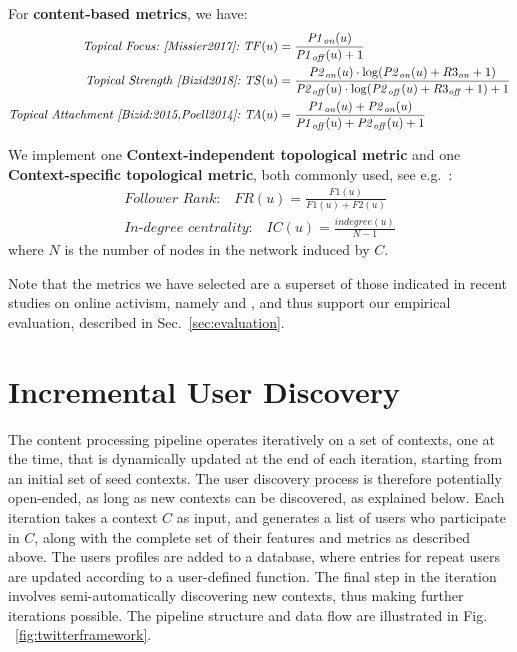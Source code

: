\documentclass[runningheads]{llncs}
\begin{document}
For \textbf{content-based metrics}, we have:
\begin{align}
\textit{Topical Focus:~\cite{Missier2017}:} ~ \mathit{TF}(u) & =  \frac{\mathit{P1}_{\mathit{on}}(u)}{\mathit{P1}_{\mathit{off}}(u) +1}    \label{eq:TF}\\
\textit{Topical Strength~\cite{Bizid2018}:} ~\mathit{TS}(u) & =	\frac{\mathit{P2}_{\mathit{on}}(u) \cdot \log(\mathit{P2}_{\mathit{on}}(u) + R3_{\mathit{on}} +1 )}{\mathit{P2}_{\mathit{off}}(u) \cdot \log(\mathit{P2}_{\mathit{off}}(u) + R3_{\mathit{off}} +1 ) + 1}   \label{eq:TS} \\
\textit{Topical Attachment~\cite{Bizid:2015,Poell2014}:} ~\mathit{TA}(u) & = \frac{\mathit{P1}_{\mathit{on}}(u) + \mathit{P2}_{\mathit{on}}(u)}{\mathit{P1}_{\mathit{off}}(u) + \mathit{P2}_{\mathit{off}}(u) +1} \label{eq:TA}
\end{align}

We implement one \textbf{Context-independent topological metric} and one \textbf{Context-specific topological metric}, both commonly used, see e.g.~\cite{RIQUELME2016949}:
\begin{align}
\textit{Follower Rank:}  \quad \mathit{FR}(u) = \frac{\mathit{F1}(u)}{\mathit{F1}(u)+\mathit{F2}(u)}   \label{eq:FR}\\
\textit{In-degree centrality:} \quad \mathit{IC}(u) = \frac{\mathit{indegree}(u)}{N-1}  \label{eq:IDC}
\end{align}
where $N$ is the number of nodes in the network induced by $C$.

Note that the metrics we have selected are a superset of those indicated in recent studies on online activism, namely \cite{Lotan2011} and \cite{Poell2014}, and thus support our empirical evaluation, described in Sec.~\ref{sec:evaluation}.



\section{Incremental User Discovery} \label{sec:Pipeline}

The content processing pipeline operates iteratively on a set of contexts, one at the time, that is dynamically updated at the end of each iteration, starting from an initial set of seed contexts.
The user discovery process is therefore potentially open-ended, as long as new contexts can be discovered, as explained below.
Each iteration takes a context $C$  as input, and generates a list of users who participate in $C$, along with the complete set of their features and metrics as described above. 
The users profiles are added to a database, where entries for repeat users are updated according to a user-defined function. 
The final step in the iteration involves semi-automatically discovering new contexts, thus making further iterations possible.
%
The pipeline structure and data flow are illustrated in Fig. ~\ref{fig:twitterframework}.
\end{document}
